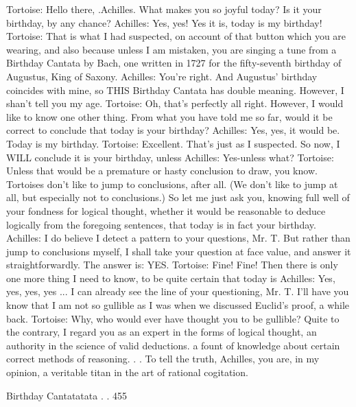Tortoise: Hello there, .Achilles. What makes you so joyful today? Is it your birthday, by
   any chance?
Achilles: Yes, yes! Yes it is, today is my birthday!
Tortoise: That is what I had suspected, on account of that button which you are wearing,
   and also because unless I am mistaken, you are singing a tune from a Birthday
   Cantata by Bach, one written in 1727 for the fifty-seventh birthday of Augustus, King
   of Saxony.
Achilles: You're right. And Augustus' birthday coincides with mine, so THIS Birthday
   Cantata has double meaning. However, I shan't tell you my age.
Tortoise: Oh, that's perfectly all right. However, I would like to know one other thing.
   From what you have told me so far, would it be correct to conclude that today is your
   birthday?
Achilles: Yes, yes, it would be. Today is my birthday.
Tortoise: Excellent. That's just as I suspected. So now, I WILL conclude it is your
   birthday, unless
Achilles: Yes-unless what?
Tortoise: Unless that would be a premature or hasty conclusion to draw, you know.
   Tortoises don't like to jump to conclusions, after all. (We don't like to jump at all, but
   especially not to conclusions.) So let me just ask you, knowing full well of your
   fondness for logical thought, whether it would be reasonable to deduce logically from
   the foregoing sentences, that today is in fact your birthday.
Achilles: I do believe I detect a pattern to your questions, Mr. T. But rather than jump to
   conclusions myself, I shall take your question at face value, and answer it
   straightforwardly. The answer is: YES.
Tortoise: Fine! Fine! Then there is only one more thing I need to know, to be quite
   certain that today is
Achilles: Yes, yes, yes, yes ... I can already see the line of your questioning, Mr. T. I'll
   have you know that I am not so gullible as I was when we discussed Euclid's proof, a
   while back.
Tortoise: Why, who would ever have thought you to be gullible? Quite to the contrary, I
   regard you as an expert in the forms of logical thought, an authority in the science of
   valid deductions. a fount of knowledge about certain correct methods of reasoning. . .
   To tell the truth, Achilles, you are, in my opinion, a veritable titan in the art of rational
   cogitation.




Birthday Cantatatata . .                                                                   455


